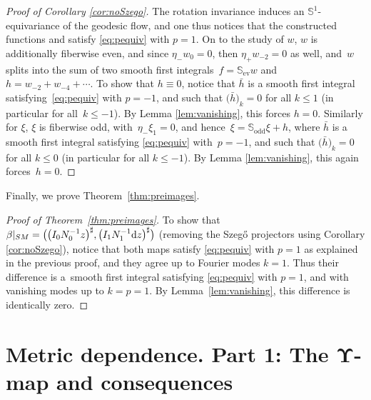 \documentclass[pdftex]{sigma}
\numberwithin{equation}{section}
\theoremstyle{definition}
\newcommand{\1}{{\bf 1}}
\newcommand \Sm { \mathbb{S}}
\begin{document}
\begin{proof}[Proof of Corollary \ref{cor:noSzego}]
	{The rotation invariance induces an $\Sm^1$-equivariance of the geodesic flow, and one thus notices that the constructed functions}  and  satisfy \eqref{eq:pequiv} with $p=1$. On to the study of $w$, $w$ is additionally fiberwise even, and since $\eta_- w_0 = 0$, then $\eta_+ w_{-2} = 0$ as well, and~$w$ splits into the sum of two smooth first integrals~${f = \Sm_{\mathrm{ev}} w}$ and~${h = w_{-2} + w_{-4} + \cdots}$. To show that $h\equiv 0$, notice that $\bar{h}$ is a smooth first integral satisfying~\eqref{eq:pequiv} with $p=-1$, and such that $\bigl(\bar{h}\bigr)_k = 0$ for all $k\le 1$ (in particular for all~${k\le -1}$). By Lemma \eqref{lem:vanishing}, this forces $h=0$. Similarly for $\xi$, $\xi$ is fiberwise odd, with~${\eta_- \xi_1 = 0}$, and hence~${\xi = \Sm_{\mathrm{odd}} \xi + h}$, where $\bar{h}$ is a smooth first integral satisfying \eqref{eq:pequiv} with~${p=-1}$, and such that $\bigl(\bar{h}\bigr)_k = 0$ for all $k\le 0$ (in particular for all $k\le -1$). By Lemma \eqref{lem:vanishing}, this again forces~${h=0}$.	
\end{proof}

Finally, we prove Theorem~\ref{thm:preimages}.

\begin{proof}[Proof of Theorem~\ref{thm:preimages}]
	To show that $\beta|_{SM} = \bigl(\bigl(I_0 N_{0}^{-1}z\bigr)^\sharp,\bigl(I_1 N_{1}^{-1}{\rm d}z\bigr)^\sharp\bigr)$ (removing the Szeg\H{o} projectors using Corollary \ref{cor:noSzego}), notice that both maps satisfy \eqref{eq:pequiv} with $p=1$ {as explained in the previous proof}, and they agree up to Fourier modes $k=1$. Thus their difference is a~smooth first integral satisfying \eqref{eq:pequiv} with $p=1$, and with vanishing modes up to $k=p=1$. By Lemma~\ref{lem:vanishing}, this difference is identically zero.
\end{proof}

\section[Metric dependence. Part 1: The Upsilon-map and consequences]{Metric dependence. Part 1: The $\boldsymbol{\Upsilon}$-map and consequences}\label{s_upsilon}
\end{document}
